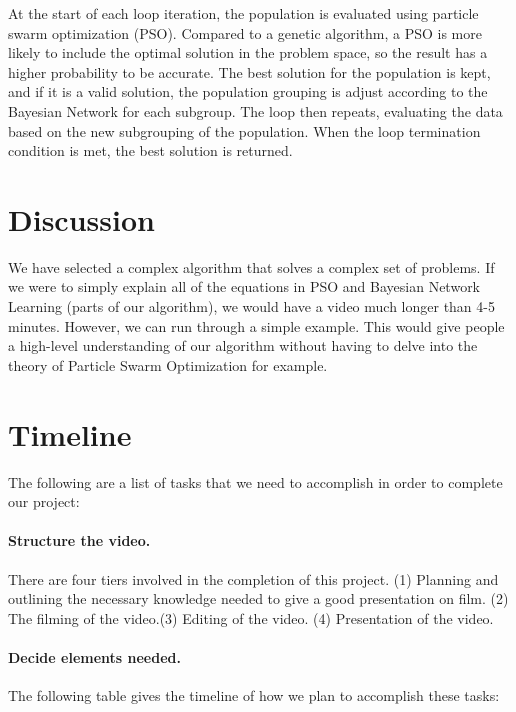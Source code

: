 \documentclass[11pt,twocolumn]{article}
\begin{document}
At the start of each loop iteration, the population is evaluated using particle swarm optimization (PSO). Compared to a genetic algorithm, a PSO is more likely to include the optimal solution in the problem space, so the result has a higher probability to be accurate\cite{sun2015bayesian}. The best solution for the population is kept, and if it is a valid solution, the population grouping is adjust according to the Bayesian Network for each subgroup. The loop then repeats, evaluating the data based on the new subgrouping of the population. When the loop termination condition is met, the best solution is returned.

\section{Discussion}
We have selected a complex algorithm that solves a complex set of problems. If we were to simply explain all of the equations in PSO and Bayesian Network Learning (parts of our algorithm), we would have a video much longer than 4-5 minutes. However, we can run through a simple example. This would give people a high-level understanding of our algorithm without having to delve into the theory of Particle Swarm Optimization for example. 



 

\newpage
\appendix
\section{Timeline}
The following are a list of tasks that we need to accomplish in order to 
complete our project:

\paragraph{Structure the video.} There are four tiers involved in the completion of this project. (1) Planning and outlining the necessary knowledge needed to give a good presentation on film. (2) The filming of the video.(3) Editing of the video. (4) Presentation of the video.

\paragraph{Decide elements needed.}  

The following table gives the timeline of how we plan to accomplish these tasks:
\end{document}
